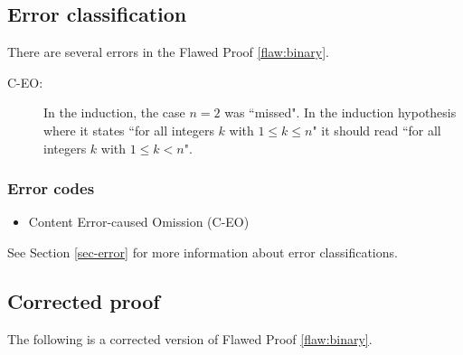 \clearpage
\subsection{Error classification}


There are several errors
 in the Flawed Proof \ref{flaw:binary}. %

 
 \begin{description}
 	\item[C-EO:] In the induction, the case $n=2$ was ``missed". In the induction hypothesis where it states ``for all integers $k$ with $1 \leq k \leq n$" it should read ``for all integers $k$ with $1 \leq k < n$". 
 \end{description}

 
\subsubsection{Error codes}
\begin{itemize}
	\item Content Error-caused Omission (C-EO)
\end{itemize}
See Section \ref{sec-error} for more information about error classifications.

\clearpage
\subsection{Corrected proof}

The following is a corrected version of Flawed Proof \ref{flaw:binary}. %

